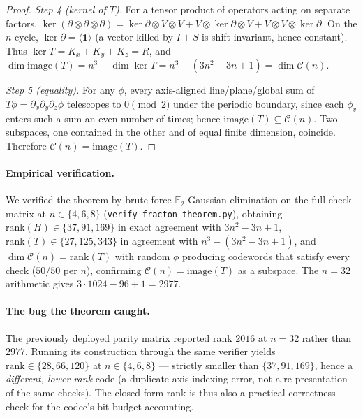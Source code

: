\documentclass[11pt,a4paper]{article}
\begin{document}
\begin{proof}
\smallskip
\noindent\emph{Step 4 (kernel of $T$).} For a tensor product of
operators acting on separate factors, $\ker(\partial \otimes \partial
\otimes \partial) = \ker\partial \otimes V \otimes V + V \otimes
\ker\partial \otimes V + V \otimes V \otimes \ker\partial$. On the
$n$-cycle, $\ker\partial = \langle \mathbf{1} \rangle$ (a vector killed
by $I+S$ is shift-invariant, hence constant). Thus $\ker T = K_x + K_y +
K_z = R$, and $\dim \mathrm{image}(T) = n^3 - \dim\ker T = n^3 - (3n^2 -
3n + 1) = \dim \mathcal{C}(n)$.

\smallskip
\noindent\emph{Step 5 (equality).} For any $\phi$, every axis-aligned
line/plane/global sum of $T\phi = \partial_x \partial_y \partial_z \phi$
telescopes to $0 \pmod 2$ under the periodic boundary, since each
$\phi_v$ enters such a sum an even number of times; hence
$\mathrm{image}(T) \subseteq \mathcal{C}(n)$. Two subspaces, one
contained in the other and of equal finite dimension, coincide.
Therefore $\mathcal{C}(n) = \mathrm{image}(T)$.
\end{proof}

\paragraph{Empirical verification.}
We verified the theorem by brute-force $\mathbb{F}_2$ Gaussian
elimination on the full check matrix at $n \in \{4, 6, 8\}$
(\texttt{verify\_fracton\_theorem.py}), obtaining
$\mathrm{rank}(H) \in \{37, 91, 169\}$ in exact agreement with
$3n^2 - 3n + 1$, $\mathrm{rank}(T) \in \{27, 125, 343\}$ in agreement
with $n^3 - (3n^2 - 3n + 1)$, and $\dim \mathcal{C}(n) = \mathrm{rank}(T)$
with random $\phi$ producing codewords that satisfy every check
($50/50$ per $n$), confirming $\mathcal{C}(n) = \mathrm{image}(T)$ as a
subspace. The $n=32$ arithmetic gives $3 \cdot 1024 - 96 + 1 = 2977$.

\paragraph{The bug the theorem caught.}
The previously deployed parity matrix reported rank $2016$ at $n=32$
rather than $2977$. Running its construction through the same verifier
yields $\mathrm{rank} \in \{28, 66, 120\}$ at $n \in \{4,6,8\}$ ---
strictly smaller than $\{37,91,169\}$, hence a \emph{different,
lower-rank} code (a duplicate-axis indexing error, not a
re-presentation of the same checks). The closed-form rank is thus also
a practical correctness check for the codec's bit-budget accounting.
\end{document}
